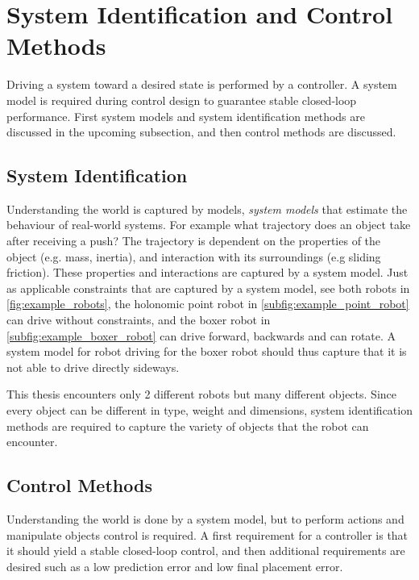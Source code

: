 \section{System Identification and Control Methods}%
\label{sec:sys_iden_and_control_methods}
Driving a system toward a desired state is performed by a controller. A system model is required during control design to guarantee stable closed-loop performance. First system models and system identification methods are discussed in the upcoming subsection, and then control methods are discussed.\bs

\subsection{System Identification}%
\label{subsec:sys_iden}
Understanding the world is captured by models, \textit{system models} that estimate the behaviour of real-world systems. For example what trajectory does an object take after receiving a push? The trajectory is dependent on the properties of the object (e.g. mass, inertia), and interaction with its surroundings (e.g sliding friction). These properties and interactions are captured by a system model. Just as applicable constraints that are captured by a system model, see both robots in \cref{fig:example_robots}, the holonomic point robot in \cref{subfig:example_point_robot} can drive without constraints, and the boxer robot in \cref{subfig:example_boxer_robot} can drive forward, backwards and can rotate. A system model for robot driving for the boxer robot should thus capture that it is not able to drive directly sideways.\bs

This thesis encounters only 2 different robots but many different objects. Since every object can be different in type, weight and dimensions, system identification methods are required to capture the variety of objects that the robot can encounter.\bs


\subsection{Control Methods}%
\label{subsec:control_methods}
Understanding the world is done by a system model, but to perform actions and manipulate objects control is required. A first requirement for a controller is that it should yield a stable closed-loop control, and then additional requirements are desired such as a low prediction error and low final placement error.

